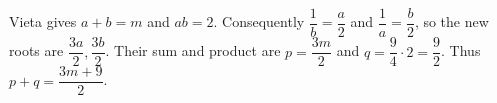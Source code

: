 Vieta gives $a+b=m$ and $ab=2$. Consequently $\dfrac{1}{b}=\dfrac{a}{2}$ and $\dfrac{1}{a}=\dfrac{b}{2}$, so the new roots are $\dfrac{3a}{2},\dfrac{3b}{2}$. Their sum and product are $p=\dfrac{3m}{2}$ and $q=\dfrac{9}{4}\cdot2=\dfrac{9}{2}$. Thus $\boxed{p+q=\dfrac{3m+9}{2}}$.

